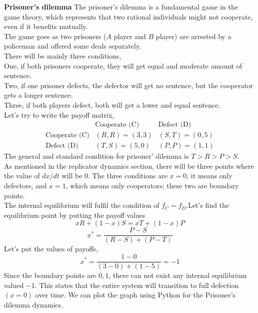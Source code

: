 \documentclass{article}
\begin{document}
\textbf{Prisoner's dilemma}
\newline
The prisoner's dilemma is a fundamental game in the game theory, which represents that two rational individuals might not cooperate, even if it benefits mutually.\\
The game goes as two prisoners ($A$ player and $B$ player) are arrested by a policeman and offered some deals separately.\\
There will be mainly three conditions,\\
One, if both prisoners cooperate, they will get equal and moderate amount of sentence.\\
Two, if one prisoner defects, the defector will get no sentence, but the cooperator gets a longer sentence.\\
Three, if both players defect, both will get a lower and equal sentence.\\
Let's try to write the payoff matrix,
\[
\begin{array}{c|cc}
    & \text{Cooperate (C)} & \text{Defect (D)} \\
    \hline
    \text{Cooperate (C)} & (R,R) = (3,3) & (S,T) = (0,5) \\
    \text{Defect (D)} & (T,S) = (5,0) & (P,P) = (1,1)
\end{array}
\]
The general and standard condition for prisoner' dilemma is $T>R>P>S$.\\
As mentioned in the replicator dynamics section, there will be three points where the value of $dx/dt$ will be $0$. The three conditions are $x=0$, it means only defectors, and $x=1$, which means only cooperators; these two are boundary points.\\
The internal equilibrium will fulfil the condition of $f_C=f_D$.Let's find the equilibrium point by putting the payoff values\\
\[xR+(1-x)S= xT+(1-x)P\]
\[x^*=\frac{P-S}{(R-S)+(P-T)}\]
Let's put the values of payoffs,
\[x^*=\frac{1-0}{(3-0)+(1-5)}= -1\]
Since the boundary points are ${0,1}$, there can not exist any internal equilibrium valued $-1$. This states that the entire system will transition to full defection $(x=0)$ over time.
We can plot the graph using Python for the Prisoner's dilemma dynamics.\\
\end{document}
